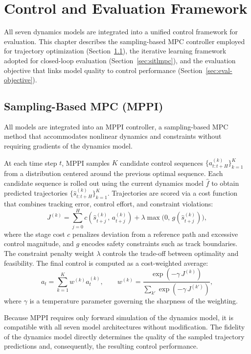 \chapter{Control and Evaluation Framework}
\label{sec:control}

All seven dynamics models are integrated into a unified control framework for evaluation. This chapter describes the sampling-based MPC controller employed for trajectory optimization (Section~\ref{sec:mppi}), the iterative learning framework adopted for closed-loop evaluation (Section~\ref{sec:sitlmpc}), and the evaluation objective that links model quality to control performance (Section~\ref{sec:eval-objective}).

\section{Sampling-Based MPC (MPPI)}
\label{sec:mppi}

All models are integrated into an MPPI controller, a sampling-based MPC method that accommodates nonlinear dynamics and constraints without requiring gradients of the dynamics model.

At each time step $t$, MPPI samples $K$ candidate control sequences $\{a^{(k)}_{t:t+H}\}_{k=1}^K$ from a distribution centered around the previous optimal sequence. Each candidate sequence is rolled out using the current dynamics model $\hat{f}$ to obtain predicted trajectories $\{\hat{s}^{(k)}_{t:t+H}\}_{k=1}^K$. Trajectories are scored via a cost function that combines tracking error, control effort, and constraint violations:
\begin{equation}
  J^{(k)} = \sum_{j=0}^{H} c(\hat{s}^{(k)}_{t+j},\, a^{(k)}_{t+j}) + \lambda \max\!\big(0,\, g(\hat{s}^{(k)}_{t+j})\big),
\end{equation}
where the stage cost $c$ penalizes deviation from a reference path and excessive control magnitude, and $g$ encodes safety constraints such as track boundaries. The constraint penalty weight $\lambda$ controls the trade-off between optimality and feasibility. The final control is computed as a cost-weighted average:
\begin{equation}
  a_t = \sum_{k=1}^K w^{(k)} a^{(k)}_t, \qquad w^{(k)} = \frac{\exp(-\gamma\, J^{(k)})}{\sum_{k'} \exp(-\gamma\, J^{(k')})},
\end{equation}
where $\gamma$ is a temperature parameter governing the sharpness of the weighting.

Because MPPI requires only forward simulation of the dynamics model, it is compatible with all seven model architectures without modification. The fidelity of the dynamics model directly determines the quality of the sampled trajectory predictions and, consequently, the resulting control performance.

